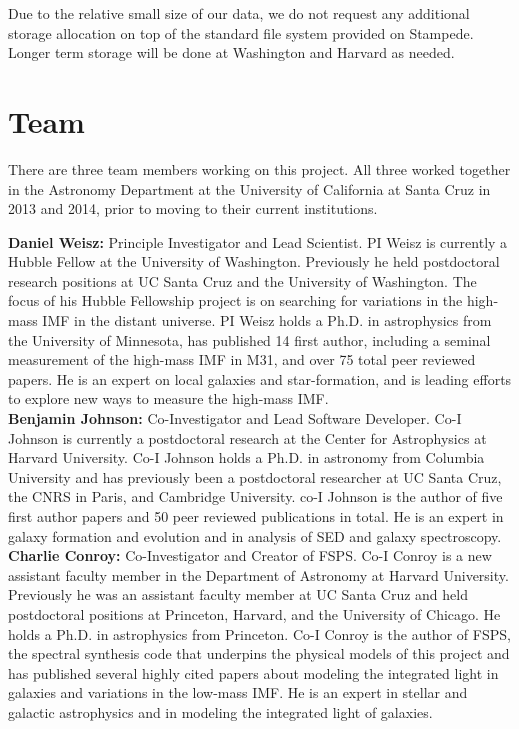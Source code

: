 \documentclass[11pt,preprint]{aastex}
\begin{document}
Due to the relative small size of our data, we do not request any additional storage allocation on top of the standard file system provided on Stampede.  Longer term storage will be done at Washington and Harvard as needed.





\section{Team}

There are three team members working on this project.  All three worked together in the Astronomy Department at the University of California at Santa Cruz in 2013 and 2014, prior to moving to their current institutions.

\textbf{Daniel Weisz:}  Principle Investigator and Lead Scientist.  PI Weisz is currently a Hubble Fellow at the University of Washington.  Previously he held postdoctoral research positions at UC Santa Cruz and the University of Washington.  The focus of his Hubble Fellowship project is on searching for variations in the high-mass IMF in the distant universe.  PI Weisz holds a Ph.D. in astrophysics from the University of Minnesota, has published 14 first author, including a seminal measurement of the high-mass IMF in M31, and over 75 total peer reviewed papers. He is an expert on local galaxies and star-formation, and is leading efforts to explore new ways to measure the high-mass IMF.  \\

\textbf{Benjamin Johnson:} Co-Investigator and Lead Software Developer.  Co-I Johnson is currently a postdoctoral research at the Center for Astrophysics at Harvard University.  Co-I Johnson holds a Ph.D. in astronomy from Columbia University and has previously been a postdoctoral researcher at UC Santa Cruz, the CNRS in Paris, and Cambridge University.  co-I Johnson is the author of five first author papers and 50 peer reviewed publications in total.  He is an expert in galaxy formation and evolution and in analysis of SED and galaxy spectroscopy.  \\

\textbf{Charlie Conroy:}  Co-Investigator and Creator of FSPS.  Co-I Conroy is a new assistant faculty member in the Department of Astronomy at Harvard University.  Previously he was an assistant faculty member at UC Santa Cruz and held postdoctoral positions at Princeton, Harvard, and the University of Chicago.  He holds a Ph.D. in astrophysics from Princeton.  Co-I Conroy is the author of FSPS, the spectral synthesis code that underpins the physical models of this project and has published several highly cited papers about modeling the integrated light in galaxies and variations in the low-mass IMF.  He is an expert in stellar and galactic astrophysics and in modeling the integrated light of galaxies. \\




%

\end{document}
